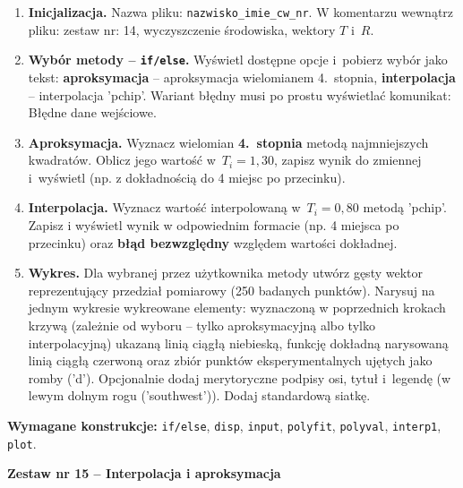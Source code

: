 \documentclass[a4paper,11pt]{article}
\begin{document}
\begin{enumerate}[leftmargin=*, label=\textbf{\arabic*.}, itemsep=2pt]

  \item \textbf{Inicjalizacja.}
    Nazwa pliku: \texttt{nazwisko\_imie\_cw\_nr}. W komentarzu wewnątrz pliku: zestaw nr: 14, wyczyszczenie środowiska, wektory $T$ i~$R$.

  \item \textbf{Wybór metody -- \texttt{if/else}.}
    Wyświetl dostępne opcje i~pobierz wybór jako tekst: \textbf{aproksymacja} -- aproksymacja wielomianem 4.~stopnia, \textbf{interpolacja} -- interpolacja 'pchip'. Wariant błędny musi po prostu wyświetlać komunikat: Błędne dane wejściowe.

  \item \textbf{Aproksymacja.}
    Wyznacz wielomian \textbf{4.~stopnia} metodą najmniejszych kwadratów. Oblicz jego wartość w~$T_i = 1{,}30$, zapisz wynik do zmiennej i~wyświetl (np. z dokładnością do 4 miejsc po przecinku).

  \item \textbf{Interpolacja.}
    Wyznacz wartość interpolowaną w~$T_i = 0{,}80$ metodą 'pchip'. Zapisz i wyświetl wynik w odpowiednim formacie (np. 4 miejsca po przecinku) oraz \textbf{błąd bezwzględny} względem wartości dokładnej.

  \item \textbf{Wykres.}
    Dla wybranej przez użytkownika metody utwórz gęsty wektor reprezentujący przedział pomiarowy (250 badanych punktów). Narysuj na jednym wykresie wykreowane elementy: wyznaczoną w poprzednich krokach krzywą (zależnie od wyboru -- tylko aproksymacyjną albo tylko interpolacyjną) ukazaną linią ciągłą niebieską, funkcję dokładną narysowaną linią ciągłą czerwoną oraz zbiór punktów eksperymentalnych ujętych jako romby ('d'). Opcjonalnie dodaj merytoryczne podpisy osi, tytuł i~legendę (w lewym dolnym rogu ('southwest')). Dodaj standardową siatkę.

\end{enumerate}

\vspace{0.3cm}
\begin{ramka}
\textbf{Wymagane konstrukcje:}
\texttt{if/else}, \texttt{disp}, \texttt{input}, \texttt{polyfit}, \texttt{polyval}, \texttt{interp1}, \texttt{plot}.
\end{ramka}

\clearpage
\begin{center}
  {\large\bfseries Zestaw nr 15 \quad -- \quad Interpolacja i aproksymacja}
\end{center}
\hrulefill
\vspace{0.4cm}
\end{document}
